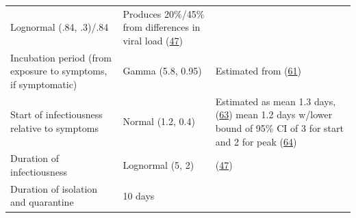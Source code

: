 \documentclass[
]{article}
\begin{document}
\begin{longtable}[]{@{}lll@{}}
\begin{minipage}[t]{0.09\columnwidth}
Lognormal (.84, .3)/.84\strut
\end{minipage} & \begin{minipage}[t]{0.54\columnwidth}\raggedright
Produces 20\%/45\% from differences in viral load
(\protect\hyperlink{ref-kerr_covasim_2020}{47})\strut
\end{minipage}\tabularnewline
\begin{minipage}[t]{0.28\columnwidth}\raggedright
Incubation period (from exposure to symptoms, if symptomatic)\strut
\end{minipage} & \begin{minipage}[t]{0.09\columnwidth}\raggedright
Gamma (5.8, 0.95)\strut
\end{minipage} & \begin{minipage}[t]{0.54\columnwidth}\raggedright
Estimated from (\protect\hyperlink{ref-lauer_incubation_2020}{61})\strut
\end{minipage}\tabularnewline
\begin{minipage}[t]{0.28\columnwidth}\raggedright
Start of infectiousness relative to symptoms\strut
\end{minipage} & \begin{minipage}[t]{0.09\columnwidth}\raggedright
Normal (1.2, 0.4)\strut
\end{minipage} & \begin{minipage}[t]{0.54\columnwidth}\raggedright
Estimated as mean 1.3 days,
(\protect\hyperlink{ref-gatto_spread_2020}{63}) mean 1.2 days w/lower
bound of 95\% CI of 3 for start and 2 for peak
(\protect\hyperlink{ref-he_temporal_2020}{64})\strut
\end{minipage}\tabularnewline
\begin{minipage}[t]{0.28\columnwidth}\raggedright
Duration of infectiousness\strut
\end{minipage} & \begin{minipage}[t]{0.09\columnwidth}\raggedright
Lognormal (5, 2)\strut
\end{minipage} & \begin{minipage}[t]{0.54\columnwidth}\raggedright
(\protect\hyperlink{ref-kerr_covasim_2020}{47})\strut
\end{minipage}\tabularnewline
\begin{minipage}[t]{0.28\columnwidth}\raggedright
Duration of isolation and quarantine\strut
\end{minipage} & \begin{minipage}[t]{0.09\columnwidth}\raggedright
10 days\strut
\end{minipage} & \begin{minipage}[t]{0.54\columnwidth}\raggedright

\end{minipage}
\end{longtable}
\end{document}
